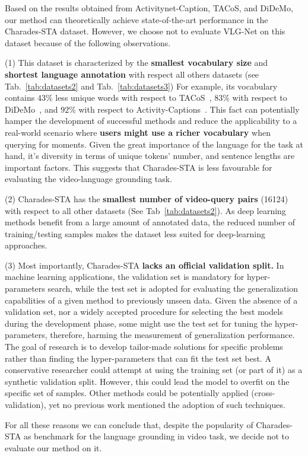 \documentclass[10pt,twocolumn,letterpaper]{article}
\begin{document}
Based on the results obtained from Activitynet-Caption, TACoS, and DiDeMo, our method can theoretically achieve state-of-the-art performance in the Charades-STA dataset. However, we choose not to evaluate VLG-Net on this dataset because of the following observations.

(1) This dataset is characterized by the \textbf{smallest vocabulary size} and \textbf{shortest language annotation} with respect all others datasets (see Tab.~\ref{tab:datasets2} and Tab.~\ref{tab:datasets3})
For example, its vocabulary contains $43\%$ less unique words with respect to TACoS~\cite{TACoS_ACL_2013}, $83\%$ with respect to DiDeMo~\cite{Hendricks_2017_ICCV}, and $92\%$ with respect to Activity-Captions~\cite{Krishna_2017_ICCV}. This fact can potentially hamper the development of successful methods and reduce the applicability to a real-world scenario where \textbf{users might use a richer vocabulary} when querying for moments.
Given the great importance of the language for the task at hand, it's diversity in terms of unique tokens' number, and sentence lengths are important factors. This suggests that Charades-STA is less favourable for evaluating the video-language grounding task.

(2) Charades-STA has the \textbf{smallest number of video-query pairs} (16124) with respect to all other datasets (See Tab~\ref{tab:datasets2}).
As deep learning methods benefit from a large amount of annotated data, the reduced number of training/testing samples makes the dataset less suited for deep-learning approaches. 

(3) Most importantly, Charades-STA \textbf{lacks an official validation split.}
In machine learning applications, the validation set is mandatory for hyper-parameters search, while the test set is adopted for evaluating the generalization capabilities of a given method to previously unseen data. Given the absence of a validation set, nor a widely accepted procedure for selecting the best models during the development phase, some might use the test set for tuning the hyper-parameters, therefore, harming the measurement of generalization performance. 
The goal of research is to develop tailor-made solutions for specific problems rather than finding the hyper-parameters that can fit the test set best.
A conservative researcher could attempt at using the training set (or part of it) as a synthetic validation split. However, this could lead the model to overfit on the specific set of samples. Other methods could be potentially applied (\eg cross-validation), yet no previous work mentioned the adoption of such techniques. 

For all these reasons we can conclude that, despite the popularity of Charades-STA as benchmark for the language grounding in video task, we decide not to evaluate our method on it.


 
\end{document}
